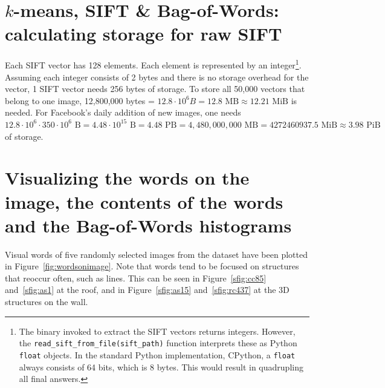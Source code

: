 \documentclass[a4paper,10pt,twoside]{article}
\begin{document}
\section{$k$-means, SIFT \& Bag-of-Words: calculating storage for raw SIFT}
Each SIFT vector has 128 elements.  Each element is represented by an integer\footnote{The binary invoked to extract the SIFT vectors returns integers.  However, the \texttt{read\_sift\_from\_file(sift\_path)} function interprets these as Python \texttt{float} objects.  In the standard Python implementation, CPython, a \texttt{float} always consists of 64 bits, which is 8 bytes.  This would result in quadrupling all final answers.}.  Assuming each integer consists of 2 bytes and there is no storage overhead for the vector, 1 SIFT vector needs 256 bytes of storage.  To store all 50,000 vectors that belong to one image, 12,800,000 bytes = $12.8 \cdot 10^6 B = 12.8 \mbox{ MB} \approx 12.21 \mbox{ MiB}$ is needed.  For Facebook's daily addition of new images, one needs $12.8 \cdot 10^6 \cdot 350 \cdot 10^6 \mbox{ B} = 4.48 \cdot 10^{15} \mbox{ B} = 4.48 \mbox{ PB} = 4,480,000,000 \mbox{ MB} = 4272460937.5 \mbox{ MiB} \approx 3.98 \mbox{ PiB}$ of storage.

\section{Visualizing the words on the image, the contents of the words and the Bag-of-Words histograms}
Visual words of five randomly selected images from the dataset have been plotted in Figure~\ref{fig:wordsonimage}.  Note that words tend to be focused on structures that reoccur often, such as lines.  This can be seen in Figure~\ref{sfig:cc85} and~\ref{sfig:as1} at the roof, and in Figure~\ref{sfig:as15} and~\ref{sfig:rc437} at the 3D structures on the wall.
\end{document}
